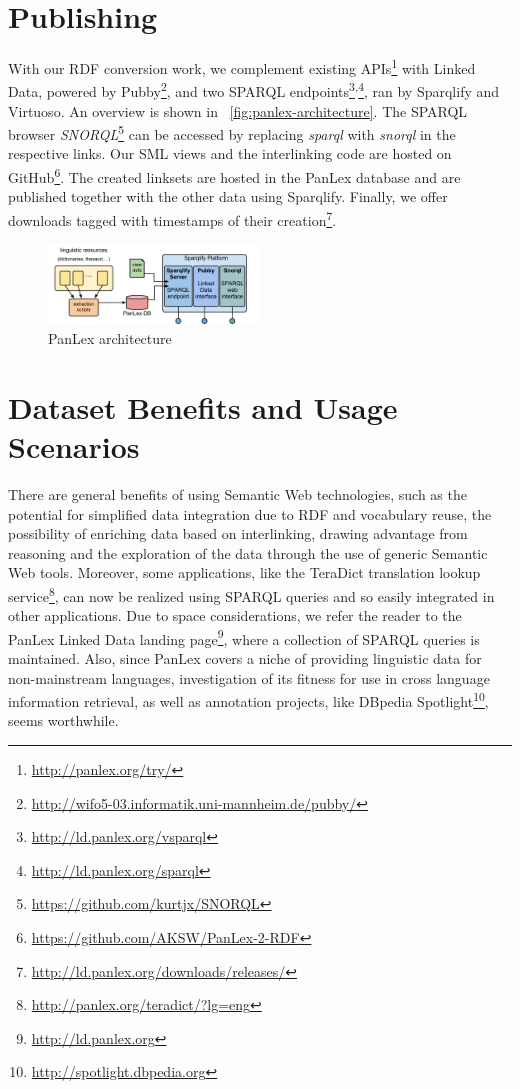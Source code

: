 \documentclass[sw]{iosart2c}
\begin{document}
\section{Publishing}
\label{sec:publishing}
With our RDF conversion work, we complement existing
APIs\footnote{\url{http://panlex.org/try/}} with Linked Data, powered by
Pubby\footnote{\url{http://wifo5-03.informatik.uni-mannheim.de/pubby/}},
and two SPARQL
endpoints\footnote{\url{http://ld.panlex.org/vsparql}}\textsuperscript{,}\footnote{\url{http://ld.panlex.org/sparql}}, ran by Sparqlify and Virtuoso.
An overview is shown in ~\autoref{fig:panlex-architecture}.
The SPARQL browser
\emph{SNORQL}\footnote{\url{https://github.com/kurtjx/SNORQL}} can be accessed
by replacing \emph{sparql} with \emph{snorql} in the respective links. Our SML
views and the interlinking code are hosted on GitHub\footnote{\url{https://github.com/AKSW/PanLex-2-RDF}}.
The created linksets are hosted in the PanLex database and are published together with the other data using Sparqlify.
Finally, we offer downloads tagged with timestamps of their creation\footnote{\url{http://ld.panlex.org/downloads/releases/}}.
\begin{figure}
\centering
\includegraphics[width=0.5\textwidth]{images/pdf/sparqlify_setup02.pdf}
\caption{PanLex architecture}
\label{fig:panlex-architecture}
\end{figure}

\section{Dataset Benefits and Usage Scenarios}
\label{sec:usage}
There are general benefits of using Semantic Web technologies, such as the
potential for simplified data integration due to RDF and vocabulary reuse, the
possibility of enriching data based on interlinking, drawing advantage from
reasoning and the exploration of the data through the use of generic Semantic
Web tools.
Moreover, some applications, like the TeraDict translation lookup
service\footnote{\url{http://panlex.org/teradict/?lg=eng}}, can now be realized
using SPARQL queries and so easily integrated in other applications.
Due to space considerations, we refer the reader to the PanLex Linked Data
landing page\footnote{\url{http://ld.panlex.org}}, where a
collection of SPARQL queries is maintained.
Also, since PanLex covers a niche of providing linguistic data for
non-mainstream languages, investigation of its fitness for use in cross
language information retrieval, as well as annotation projects, like DBpedia
Spotlight\footnote{\url{http://spotlight.dbpedia.org}}, seems worthwhile.
\end{document}
